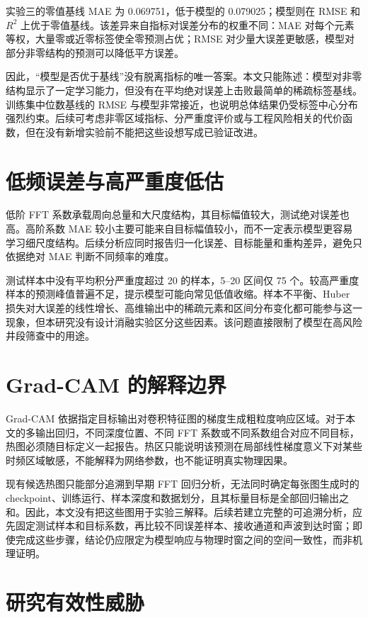 实验三的零值基线 MAE 为 0.069751，低于模型的 0.079025；模型则在 RMSE 和 $R^2$ 上优于零值基线。该差异来自指标对误差分布的权重不同：MAE 对每个元素等权，大量零或近零标签使全零预测占优；RMSE 对少量大误差更敏感，模型对部分非零结构的预测可以降低平方误差。

因此，“模型是否优于基线”没有脱离指标的唯一答案。本文只能陈述：模型对非零结构显示了一定学习能力，但没有在平均绝对误差上击败最简单的稀疏标签基线。训练集中位数基线的 RMSE 与模型非常接近，也说明总体结果仍受标签中心分布强烈约束。后续可考虑非零区域指标、分严重度评价或与工程风险相关的代价函数，但在没有新增实验前不能把这些设想写成已验证改进。

\section{低频误差与高严重度低估}

低阶 FFT 系数承载周向总量和大尺度结构，其目标幅值较大，测试绝对误差也高。高阶系数 MAE 较小主要可能来自目标幅值较小，而不一定表示模型更容易学习细尺度结构。后续分析应同时报告归一化误差、目标能量和重构差异，避免只依据绝对 MAE 判断不同频率的难度。

测试样本中没有平均积分严重度超过 20 的样本，5--20 区间仅 75 个。较高严重度样本的预测峰值普遍不足，提示模型可能向常见低值收缩。样本不平衡、Huber 损失对大误差的线性增长、高维输出中的稀疏元素和区间分布变化都可能参与这一现象，但本研究没有设计消融实验区分这些因素。该问题直接限制了模型在高风险井段筛查中的用途。

\section{Grad-CAM 的解释边界}

Grad-CAM 依据指定目标输出对卷积特征图的梯度生成粗粒度响应区域\cite{Selvaraju2017GradCAM}。对于本文的多输出回归，不同深度位置、不同 FFT 系数或不同系数组合对应不同目标，热图必须随目标定义一起报告。热区只能说明该预测在局部线性梯度意义下对某些时频区域敏感，不能解释为网络参数，也不能证明真实物理因果。

现有候选热图只能部分追溯到早期 FFT 回归分析，无法同时确定每张图生成时的 checkpoint、训练运行、样本深度和数据划分，且其标量目标是全部回归输出之和。因此，本文没有把这些图用于实验三解释。后续若建立完整的可追溯分析，应先固定测试样本和目标系数，再比较不同误差样本、接收通道和声波到达时窗；即使完成这些步骤，结论仍应限定为模型响应与物理时窗之间的空间一致性，而非机理证明。

\section{研究有效性威胁}


